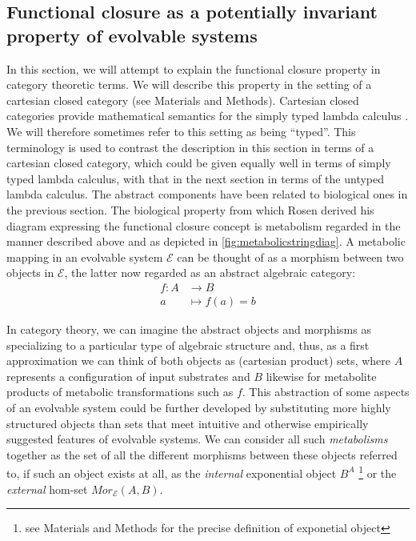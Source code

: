 \subsection*{Functional closure as a potentially invariant property of evolvable systems}

In this section, we will attempt to explain the functional closure property in category theoretic terms. We will describe this property in the setting of a cartesian closed category (see Materials and Methods). Cartesian closed categories provide mathematical semantics for the simply typed lambda calculus \cite{Barendregt1985}. We will therefore sometimes refer to this setting as being ``typed''. This terminology is used to contrast the description in this section in terms of a cartesian closed category, which could be given equally well in terms of simply typed lambda calculus, with that in the next section in terms of the untyped lambda calculus. The abstract components have been related to biological ones in the previous section. The biological property from which Rosen derived his diagram expressing the functional closure concept is metabolism regarded in the manner described above and as depicted in \ref{fig:metabolicstringdiag}. A metabolic mapping in an evolvable system $\mathcal{E}$ can be thought of as a morphism between two objects in $\mathcal{E}$, the latter now regarded as an abstract algebraic category:
\begin{align*}
f \colon A &\longrightarrow B\\
a &\longmapsto f(a)=b
\end{align*}

In category theory, we can imagine the abstract objects and morphisms as specializing to a particular type of algebraic structure and, thus, as a first approximation we can think of both objects as (cartesian product) sets, where $A$ represents a configuration of input substrates and $B$ likewise for metabolite products of metabolic transformations such as $f$. This abstraction of some aspects of an evolvable system could be further developed by substituting more highly structured objects than sets that meet intuitive and otherwise empirically suggested features of evolvable systems. We can consider all such \emph{metabolisms} together as the set of all the different morphisms between these objects referred to, if such an object exists at all, as the \emph{internal} exponential object $B^A$ \footnote{see Materials and Methods for the precise definition of exponetial object} or the \emph{external} hom-set $Mor_{\mathcal{E}}(A,B)$.

